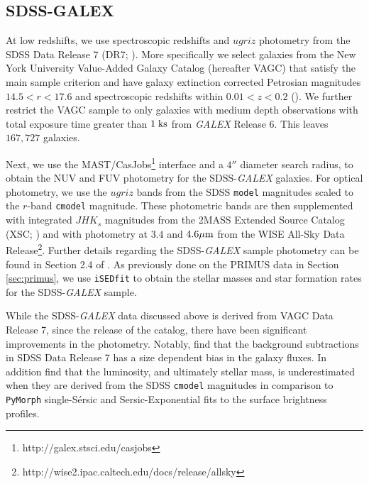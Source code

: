 \documentclass{emulateapj}
\begin{document}
\subsection{SDSS-GALEX} \label{sec:sdss}
At low redshifts, we use spectroscopic redshifts and $ugriz$ photometry from the SDSS Data Release 7 (DR7; \citealt{Abazajian:2009aa}). More specifically we select galaxies from the New York University Value-Added Galaxy Catalog (hereafter VAGC) that satisfy the main sample criterion and have galaxy extinction corrected Petrosian magnitudes $14.5 < r < 17.6$ and spectroscopic redshifts within $0.01 < z < 0.2$ (\citealt{Blanton:2005aa}). We further restrict the VAGC sample to only galaxies with medium depth observations with total exposure time greater than $1 \; \rm{ks}$ from {\em GALEX} Release 6. This leaves $167,727$ galaxies. 

Next, we use the MAST/CasJobs\footnote{http://galex.stsci.edu/casjobs} interface and a $4''$ diameter search radius, to obtain the NUV and FUV photometry for the SDSS-{\em GALEX} galaxies. For optical photometry, we use the $ugriz$ bands from the SDSS \texttt{model} magnitudes scaled to the $r$-band \texttt{cmodel} magnitude. These photometric bands are then supplemented with integrated $JHK_s$ magnitudes from the 2MASS Extended Source Catalog (XSC; \citealt{Jarrett:2000aa}) and with photometry at $3.4$ and $4.6 \mu \rm{m}$ from the WISE All-Sky Data Release\footnote{http://wise2.ipac.caltech.edu/docs/release/allsky}. Further details regarding the SDSS-{\em GALEX} sample photometry can be found in Section 2.4 of \cite{Moustakas:2013aa}. As previously done on the PRIMUS data in Section \ref{sec:primus}, we use \texttt{iSEDfit} to obtain the stellar masses and star formation rates for the SDSS-{\em GALEX} sample. 

While the SDSS-{\em GALEX} data discussed above is derived from VAGC Data Release 7, since the release of the catalog, there have been significant improvements in the photometry. Notably, \cite{Blanton:2011aa} find that the background subtractions in SDSS Data Release 7 has a size dependent bias in the galaxy fluxes. In addition \cite{Bernardi:2013aa} find that the luminosity, and ultimately stellar mass, is underestimated when they are derived from the SDSS \texttt{cmodel} magnitudes in comparison to \texttt{PyMorph} single-S\'{e}rsic and Sersic-Exponential fits to the surface brightness profiles. 
\end{document}
